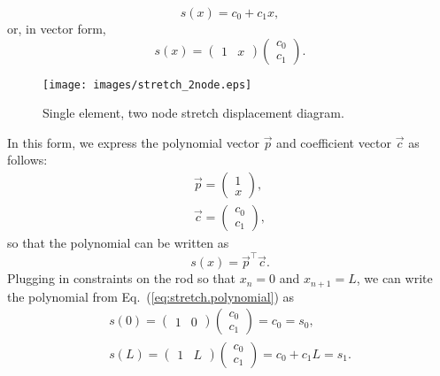 \begin{equation}
s(x) = c_0 + c_1x,
\label{eq:stretch.polynomial}
\end{equation}
or, in vector form,
\begin{equation}
s(x) = 
\begin{pmatrix}
1 & x
\end{pmatrix}
\begin{pmatrix}
c_0 \\
c_1
\end{pmatrix}.
\end{equation}

\begin{figure}[ht!]
\caption{Single element, two node stretch displacement diagram.}
\centering
\texttt{[image: images/stretch\_2node.eps]}
\label{fig:2-node-stretch-dof}
\end{figure}
\noindent In this form, we express the polynomial vector $\vec p$ and coefficient vector $\vec c$ as follows:
\begin{eqnarray}
\vec{p} =
\begin{pmatrix}
1 \\
x
\end{pmatrix}, \\
\vec{c} = 
\begin{pmatrix}
c_0 \\
c_1
\end{pmatrix},
\end{eqnarray}
so that the polynomial can be written as
\begin{equation}
s(x) = \vec{p}^\top\vec{c}.
\label{eq:stretch.polynomial.vector}
\end{equation}
Plugging in constraints on the rod so that $x_n=0$ and $x_{n+1}=L$, we can write the polynomial from Eq.~(\ref{eq:stretch.polynomial}) as
\begin{eqnarray}
s(0) = 
\begin{pmatrix}
1 & 0
\end{pmatrix}
\begin{pmatrix}
c_0 \\
c_1
\end{pmatrix}
= c_0 = s_0,\\
s(L) = 
\begin{pmatrix}
1 & L
\end{pmatrix}
\begin{pmatrix}
c_0 \\
c_1
\end{pmatrix}
= c_0 + c_1L = s_1.
\end{eqnarray}
